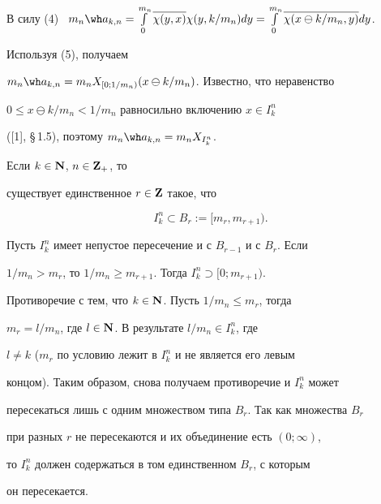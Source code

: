 \begin{pf}


В силу (4) \ $m_n{\wh a}_{k,n}=\int\limits^{m_n}_0


\overline{\chi(y,x)}\chi(y,k/m_n)dy=


\int\limits^{m_n}_0\overline {\chi(x\ominus k/m_n,y)}dy$. 


Используя (5), получаем


$m_n{\wh a}_{k,n}=m_nX_{[0;1/m_n)}(x\ominus k/m_n)$. Известно, что неравенство


$0\leq x\ominus k/m_n < 1/m_n$ равносильно включению $x\in I^n_k$


([1], \S\,1.5), поэтому $m_n{\wh a}_{k,n}=m_nX_{I^n_k}$.


\end{pf}








\begin{lems}


Если $k\in {\bold N}$, $n\in {\bold Z}_+$, то 


существует единственное $r\in {\bold Z}$ такое, что


$$


I^n_k\subset B_r:=[m_r,m_{r+1}).


$$


\end{lems}








\begin{pf}


Пусть $I^n_k$ имеет непустое пересечение и с $B_{r-1}$ и с $B_r$. Если


$1/m_n>m_r$, то $1/m_n\geq m_{r+1}$. Тогда $I^n_k\supset [0;m_{r+1})$.


Противоречие с тем, что $k\in {\bold N}$. Пусть $1/m_n\leq m_r$, тогда


$m_r=l/m_n$, где $l\in {\bold N}$. В результате $l/m_n\in I^n_k$, где


$l\neq k$ ($m_r$ по условию лежит в $I^n_k$ и не является его левым 


концом). Таким образом, снова получаем противоречие и $I^n_k$ может 


пересекаться лишь с одним множеством типа $B_r$. Так как множества $B_r$ 


при разных $r$ не пересекаются и их объединение есть $(0;\infty)$,


то $I^n_k$ должен содержаться в том единственном $B_r$, с которым 


он пересекается.


\end{pf}





